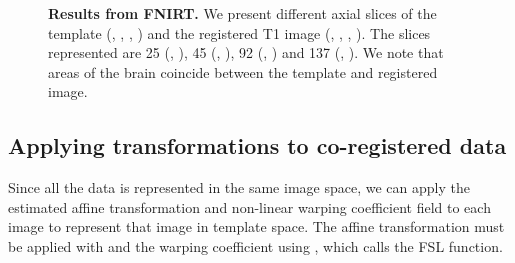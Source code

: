 \begin{figure}
{} \hspace*{-0.9em}
   \hspace*{-0.9em}
   \hspace*{-0.9em}
  \hspace*{-0.9em}
\caption{{\bf Results from FNIRT.} We present different axial slices of the template (\protect{}, \protect{}, \protect{}, \protect{}) and the registered T1 image (\protect{}, \protect{}, \protect{}, \protect{}).  The slices represented are 25 (\protect{}, \protect{}), 45 (\protect{}, \protect{}), 92 (\protect{}, \protect{}) and 137 (\protect{}, \protect{}).  We note that areas of the brain coincide between the template and registered image.}
\label{fig:fnirt_slice}
\end{figure}



\subsection{Applying transformations to co-registered data}
Since all the data is represented in the same image space, we can apply the estimated affine transformation and non-linear warping coefficient field to each image to represent that image in template space.  The affine transformation must be applied with  and the warping coefficient using , which calls the FSL  function.  



